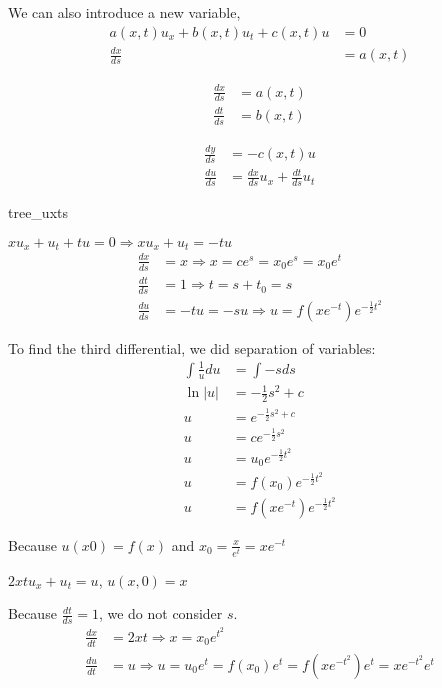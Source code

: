 \documentclass{article}
\begin{document}
We can also introduce a new variable,
%
\begin{align}
  a(x, t) u_x + b(x, t) u_t + c(x, t) u & = 0\\
  \frac{dx}{ds} & = a(x, t)
\end{align}

\begin{multicols}{2}
  \begin{align}
    \frac{dx}{ds} & = a(x, t)\\
    \frac{dt}{ds} & = b(x, t)
  \end{align}

  \begin{align}
    \frac{dy}{ds} & = -c(x, t) u\\
    \frac{du}{ds} & = \frac{dx}{ds} u_x + \frac{dt}{ds} u_t
  \end{align}
\end{multicols}

\begin{center}
  {tree_uxts}
\end{center}

\ex $xu_x + u_t + tu = 0 \Rightarrow xu_x + u_t = -tu$
%
\begin{align}
  \frac{dx}{ds} & = x \Rightarrow x = ce^s = x_0 e^s = x_0 e^t\\
  \frac{dt}{ds} & = 1 \Rightarrow t = s + t_0 = s\\
  \frac{du}{ds} & = -tu = -su \Rightarrow u = f\left(xe^{-t}\right)
  e^{-\frac{1}{2}t^2}
\end{align}

To find the third differential, we did separation of variables:
%
\begin{align}
  \int \frac{1}{u} du & = \int -s ds\\
  \ln |u| & = - \frac{1}{2} s^2 + c\\
  u & = e^{- \frac{1}{2} s^2 + c}\\
  u & = ce^{- \frac{1}{2} s^2}\\
  u & = u_0 e^{-\frac{1}{2} t^2}\\
  u & = f(x_0) e^{-\frac{1}{2}t^2}\\
  u & = f\left(xe^{-t}\right)e^{-\frac{1}{2}t^2}
\end{align}

Because $u(x 0) = f(x)$ and $x_0 = \frac{x}{e^t} = xe^{-t}$

\ex $2xtu_x + u_t = u$, $u(x, 0) = x$

Because $\frac{dt}{ds} = 1$, we do not consider $s$.
%
\begin{align}
  \frac{dx}{dt} & = 2xt \Rightarrow x = x_0 e^{t^2}\\
  \frac{du}{dt} & = u \Rightarrow u = u_0 e^t = f(x_0) e^t = f(xe^{-t^2})e^t
  = xe^{-t^2} e^t
\end{align}
\end{document}
